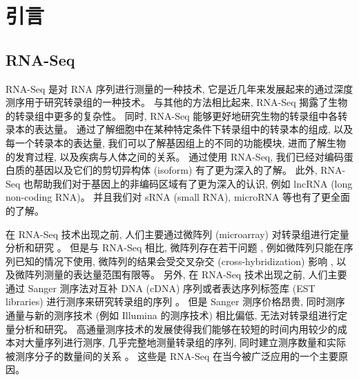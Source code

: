 \chapter{引言}
\label{chap-intro}

\section{RNA-Seq}
\nocite{wang2009rna, ozsolak2010rna, garber2011computational}

RNA-Seq 是对 RNA 序列进行测量的一种技术, 
它是近几年来发展起来的通过深度测序用于研究转录组的一种技术。
与其他的方法相比起来, RNA-Seq 揭露了生物的转录组中更多的复杂性。 
同时, RNA-Seq 能够更好地研究生物的转录组中各转录本的表达量。 
通过了解细胞中在某种特定条件下转录组中的转录本的组成, 
以及每一个转录本的表达量, 我们可以了解基因组上的不同的功能模块, 
进而了解生物的发育过程, 以及疾病与人体之间的关系。 
通过使用 RNA-Seq, 我们已经对编码蛋白质的基因以及它们的剪切异构体 (isoform) 有了更为深入的了解。 
此外, RNA-Seq 也帮助我们对于基因上的非编码区域有了更为深入的认识, 
例如 lncRNA (long non-coding RNA)。
并且我们对 sRNA (small RNA), microRNA 等也有了更全面的了解。 
\cite{pickrell2010understanding, encode, nagalakshmi2008transcriptional, 
tang2009mrna, banfai2012long, mortazavi2008mapping, wang2008alternative, 
katz2010analysis, deng2011isoform, lu2010function, mercer2011targeted, 
howald2012combining, lalonde2011rna, djebali2012landscape, 
derrien2012gencode, gerstein2012architecture, fairfax2012genetics, 
morrissy2011extensive, howald2012combining, park2012rna, 
shalek2013single, 
tilgner2012deep, orom2010long, mercer2011human, chung2011computational, 
gingeras2009implications, roy2010identification, axtell2011vive, 
berezikov2010evolutionary, cherbas2011transcriptional, anders2012detecting, 
stoeckius2009large, lau2009abundant}

在 RNA-Seq 技术出现之前, 人们主要通过微阵列 (microarray) 对转录组进行定量分析和研究 \cite{schena1995quantitative}。 
但是与 RNA-Seq 相比, 微阵列存在若干问题 \cite{wang2009rna}, 例如微阵列只能在序列已知的情况下使用, 
微阵列的结果会受交叉杂交 (cross-hybridization) 影响 \cite{okoniewski2006hybridization, royce2007toward}, 
以及微阵列测量的表达量范围有限等。
另外, 在 RNA-Seq 技术出现之前, 人们主要通过 Sanger 测序法对互补 DNA (cDNA) 序列或者表达序列标签库 (EST libraries) 进行测序来研究转录组的序列 \cite{boguski1994gene, gerhard2004status}。 
但是 Sanger 测序价格昂贵, 同时测序通量与新的测序技术 (例如 Illumina 的测序技术) 相比偏低, 
无法对转录组进行定量分析和研究。 
高通量测序技术的发展使得我们能够在较短的时间内用较少的成本对大量序列进行测序, 
几乎完整地测量转录组的序列, 
同时建立测序数量和实际被测序分子的数量间的关系 \cite{marioni2008rna}。 
这些是 RNA-Seq 在当今被广泛应用的一个主要原因。 

